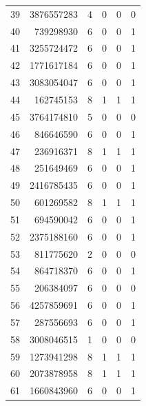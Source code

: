 \begin{longtable}{rrrrrr}
39 & 3876557283 & 4 & 0 & 0 & 0\\

40 & 739298930 & 6 & 0 & 0 & 1\\

41 & 3255724472 & 6 & 0 & 0 & 1\\

42 & 1771617184 & 6 & 0 & 0 & 1\\

43 & 3083054047 & 6 & 0 & 0 & 1\\

44 & 162745153 & 8 & 1 & 1 & 1\\

45 & 3764174810 & 5 & 0 & 0 & 0\\

46 & 846646590 & 6 & 0 & 0 & 1\\

47 & 236916371 & 8 & 1 & 1 & 1\\

48 & 251649469 & 6 & 0 & 0 & 1\\

49 & 2416785435 & 6 & 0 & 0 & 1\\

50 & 601269582 & 8 & 1 & 1 & 1\\

51 & 694590042 & 6 & 0 & 0 & 1\\

52 & 2375188160 & 6 & 0 & 0 & 1\\

53 & 811775620 & 2 & 0 & 0 & 0\\

54 & 864718370 & 6 & 0 & 0 & 1\\

55 & 206384097 & 6 & 0 & 0 & 0\\

56 & 4257859691 & 6 & 0 & 0 & 1\\

57 & 287556693 & 6 & 0 & 0 & 1\\

58 & 3008046515 & 1 & 0 & 0 & 0\\

59 & 1273941298 & 8 & 1 & 1 & 1\\

60 & 2073878958 & 8 & 1 & 1 & 1\\

61 & 1660843960 & 6 & 0 & 0 & 1\\


\end{longtable}
